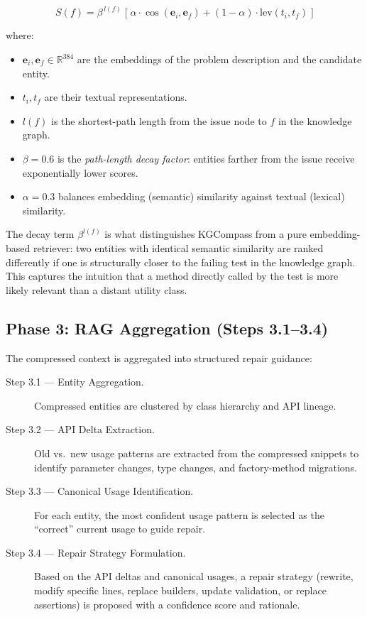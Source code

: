 \documentclass[conference,10pt]{IEEEtran}
\begin{document}
\begin{equation}
    \label{eq:kgcompass}
    S(f) = \beta^{\,l(f)} \;\Big[\;
        \alpha \cdot \cos(\mathbf{e}_i, \mathbf{e}_f)
        + (1 - \alpha) \cdot \text{lev}(t_i, t_f)
    \;\Big]
\end{equation}

where:
\begin{itemize}
    \item $\mathbf{e}_i, \mathbf{e}_f \in \mathbb{R}^{384}$ are the
          embeddings of the problem description and the candidate entity.
    \item $t_i, t_f$ are their textual representations.
    \item $l(f)$ is the shortest-path length from the issue node to $f$
          in the knowledge graph.
    \item $\beta = 0.6$ is the \emph{path-length decay factor}:
          entities farther from the issue receive exponentially lower scores.
    \item $\alpha = 0.3$ balances embedding (semantic) similarity against
          textual (lexical) similarity.
\end{itemize}

The decay term $\beta^{l(f)}$ is what distinguishes KGCompass from a
pure embedding-based retriever: two entities with identical semantic
similarity are ranked differently if one is structurally closer to the
failing test in the knowledge graph. This captures the intuition that a
method directly called by the test is more likely relevant than a
distant utility class.

\subsection{Phase 3: RAG Aggregation (Steps 3.1--3.4)}

The compressed context is aggregated into structured repair guidance:

\begin{description}
    \item[Step 3.1 --- Entity Aggregation.]
    Compressed entities are clustered by class hierarchy and API lineage.

    \item[Step 3.2 --- API Delta Extraction.]
    Old vs.\ new usage patterns are extracted from the compressed snippets
    to identify parameter changes, type changes, and factory-method
    migrations.

    \item[Step 3.3 --- Canonical Usage Identification.]
    For each entity, the most confident usage pattern is selected as the
    ``correct'' current usage to guide repair.

    \item[Step 3.4 --- Repair Strategy Formulation.]
    Based on the API deltas and canonical usages, a repair strategy
    (rewrite, modify specific lines, replace builders, update validation,
    or replace assertions) is proposed with a confidence score and
    rationale.
\end{description}
\end{document}
